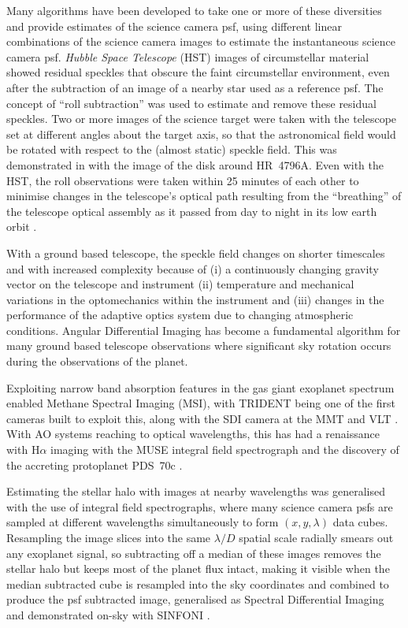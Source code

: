 \documentclass[letterpaper]{ar-1col}
\newcommand{\ld}{$\lambda/D$}
\begin{document}
Many algorithms have been developed to take one or more of these diversities and provide estimates of the science camera \ac{psf}, using different linear combinations of the science camera images to estimate the instantaneous science camera \ac{psf}.
%
{\it Hubble Space Telescope} (HST) images of circumstellar material showed residual speckles that obscure the faint circumstellar environment, even after the subtraction of an image of a nearby star used as a reference \ac{psf}.
%
The concept of ``roll subtraction''  \citep{Schneider98} was used to estimate and remove these residual speckles.
%
Two or more images of the science target were taken with the telescope set at different angles about the target axis, so that the astronomical field would be rotated with respect to the (almost static) speckle field.
%
This was demonstrated in \citet{Schneider99} with the image of the disk around HR~4796A.
%
Even with the HST, the roll observations were taken within 25 minutes of each other to minimise changes in the telescope's optical path resulting from the ``breathing'' of the telescope optical assembly as it passed from day to night in its low earth orbit \citep{Bely93}.

With a ground based telescope, the speckle field changes on shorter timescales and with increased complexity because of (i) a continuously changing gravity vector on the telescope and instrument (ii) temperature and mechanical variations in the optomechanics within the instrument and (iii) changes in the performance of the adaptive optics system due to changing atmospheric conditions.
%
Angular Differential Imaging \citep[ADI; ][]{Marois06} has become a fundamental algorithm for many ground based telescope observations where significant sky rotation occurs during the observations of the planet.

Exploiting narrow band absorption features in the gas giant exoplanet spectrum enabled Methane Spectral Imaging (MSI), with TRIDENT \citep{Marois05} being one of the first cameras built to exploit this, along with the SDI camera at the MMT and VLT \citep{Biller07-1}.
%
With AO systems reaching to optical wavelengths, this has had a renaissance with H$\alpha$ imaging with the MUSE integral field spectrograph and the discovery of the accreting protoplanet PDS~70c \citep{Haffert19}.

Estimating the stellar halo with images at nearby wavelengths was generalised with the use of integral field spectrographs, where many science camera \acp{psf} are sampled at different wavelengths simultaneously to form $(x,y,\lambda)$ data cubes.
%
Resampling the image slices into the same \ld{} spatial scale radially smears out any exoplanet signal, so subtracting off a median of these images removes the stellar halo but keeps most of the planet flux intact, making it visible when the median subtracted cube is resampled into the sky coordinates and combined to produce the \ac{psf} subtracted image, generalised as Spectral Differential Imaging \cite[SDI; ][]{Sparks02} and demonstrated on-sky with SINFONI \citep{Thatte07}.
\end{document}
